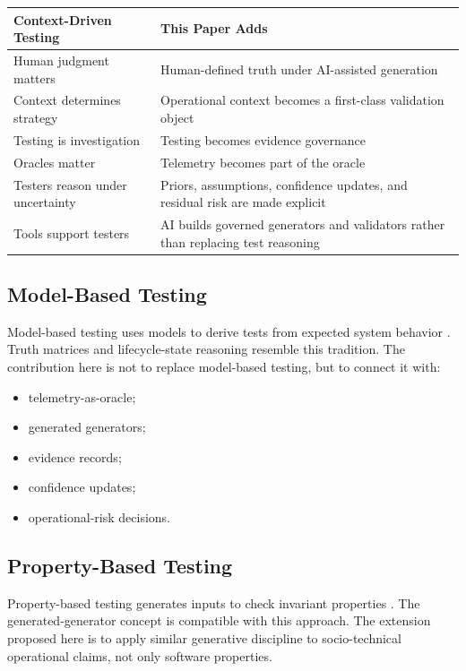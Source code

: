 \documentclass[11pt,a4paper]{article}
\begin{document}
\begin{longtable}{p{5.2cm}p{8.4cm}}
\toprule
\textbf{Context-Driven Testing} & \textbf{This Paper Adds} \\
\midrule
Human judgment matters & Human-defined truth under AI-assisted generation \\
Context determines strategy & Operational context becomes a first-class validation object \\
Testing is investigation & Testing becomes evidence governance \\
Oracles matter & Telemetry becomes part of the oracle \\
Testers reason under uncertainty & Priors, assumptions, confidence updates, and residual risk are made explicit \\
Tools support testers & AI builds governed generators and validators rather than replacing test reasoning \\
\bottomrule
\end{longtable}

\subsection{Model-Based Testing}

Model-based testing uses models to derive tests from expected system behavior \cite{utting}. Truth matrices and lifecycle-state reasoning resemble this tradition. The contribution here is not to replace model-based testing, but to connect it with:
\begin{itemize}
\item telemetry-as-oracle;
\item generated generators;
\item evidence records;
\item confidence updates;
\item operational-risk decisions.
\end{itemize}

\subsection{Property-Based Testing}

Property-based testing generates inputs to check invariant properties \cite{claessen}. The generated-generator concept is compatible with this approach. The extension proposed here is to apply similar generative discipline to socio-technical operational claims, not only software properties.
\end{document}
